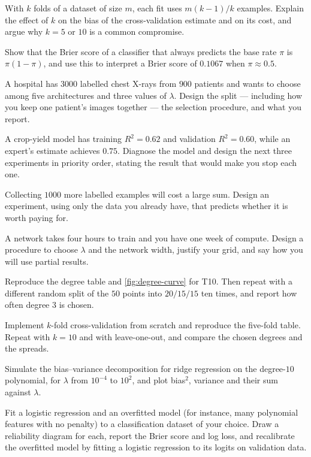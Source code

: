 \ap With $k$ folds of a dataset of size $m$, each fit uses $m(k-1)/k$ examples.
Explain the effect of $k$ on the bias of the cross-validation estimate and on its
cost, and argue why $k = 5$ or $10$ is a common compromise.

\ap Show that the Brier score of a classifier that always predicts the base rate
$\pi$ is $\pi(1-\pi)$, and use this to interpret a Brier score of $0.1067$ when
$\pi \approx 0.5$.


\dpr A hospital has $3000$ labelled chest X-rays from $900$ patients and wants to
choose among five architectures and three values of $\lambda$. Design the split
--- including how you keep one patient's images together --- the selection
procedure, and what you report.

\dpr A crop-yield model has training $R^2 = 0.62$ and validation $R^2 = 0.60$,
while an expert's estimate achieves $0.75$. Diagnose the model and design the
next three experiments in priority order, stating the result that would make you
stop each one.

\dpr Collecting $1000$ more labelled examples will cost a large sum. Design an
experiment, using only the data you already have, that predicts whether it is
worth paying for.

\dpr A network takes four hours to train and you have one week of compute.
Design a procedure to choose $\lambda$ and the network width, justify your grid,
and say how you will use partial results.


\pe Reproduce the degree table and \cref{fig:degree-curve} for T10. Then repeat
with a different random split of the $50$ points into $20/15/15$ ten times, and
report how often degree $3$ is chosen.

\pe Implement $k$-fold cross-validation from scratch and reproduce the five-fold
table. Repeat with $k = 10$ and with leave-one-out, and compare the chosen
degrees and the spreads.

\pe Simulate the bias--variance decomposition for ridge regression on the
degree-$10$ polynomial, for $\lambda$ from $10^{-4}$ to $10^2$, and plot bias$^2$,
variance and their sum against $\lambda$.

\pe Fit a logistic regression and an overfitted model (for instance, many
polynomial features with no penalty) to a classification dataset of your choice.
Draw a reliability diagram for each, report the Brier score and log loss, and
recalibrate the overfitted model by fitting a logistic regression to its logits
on validation data.

